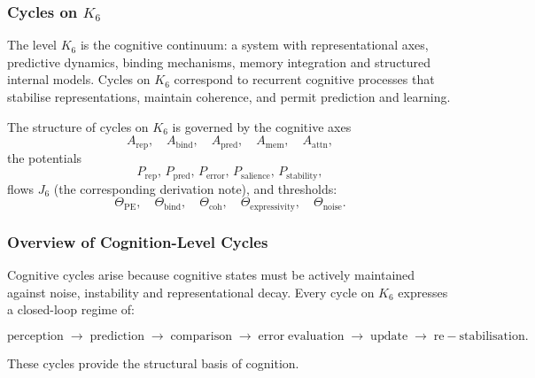 
\subsubsection{Cycles on \texorpdfstring{$K_6$}{K_6}}
\label{sec:cycles-k6}

The level $K_6$ is the cognitive continuum: a system with representational
axes, predictive dynamics, binding mechanisms, memory integration and
structured internal models.
Cycles on $K_6$ correspond to recurrent cognitive processes that stabilise
representations, maintain coherence, and permit prediction and learning.

The structure of cycles on $K_6$ is governed by the cognitive axes
\[
 A_{\mathrm{rep}},\quad
 A_{\mathrm{bind}},\quad
 A_{\mathrm{pred}},\quad
 A_{\mathrm{mem}},\quad
 A_{\mathrm{attn}},
\]
the potentials
\[
 P_{\mathrm{rep}},\, P_{\mathrm{pred}},\, P_{\mathrm{error}},\,
 P_{\mathrm{salience}},\, P_{\mathrm{stability}},
\]
flows $J_6$ (the corresponding derivation note), and thresholds:
\[
 \Theta_{\mathrm{PE}},\quad
 \Theta_{\mathrm{bind}},\quad
 \Theta_{\mathrm{coh}},\quad
 \Theta_{\mathrm{expressivity}},\quad
 \Theta_{\mathrm{noise}}.
\]

\subsubsection{Overview of Cognition-Level Cycles}

Cognitive cycles arise because cognitive states must be actively maintained
against noise, instability and representational decay.
Every cycle on $K_6$ expresses a closed-loop regime of:

\[
  \mathrm{perception}
  \;\to\;
  \mathrm{prediction}
  \;\to\;
  \mathrm{comparison}
  \;\to\;
  \mathrm{error\;evaluation}
  \;\to\;
  \mathrm{update}
  \;\to\;
  \mathrm{re-stabilisation}.
\]

These cycles provide the structural basis of cognition.

